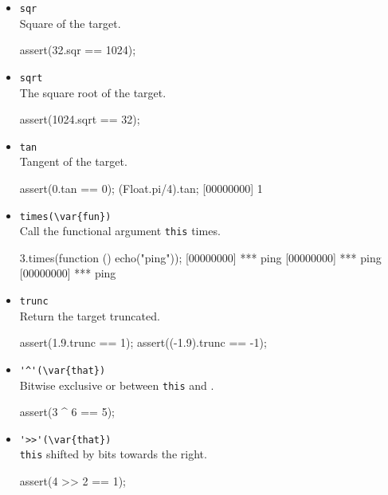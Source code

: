 \begin{itemize}
\item \lstinline|sqr|\\
  Square of the target.
\begin{urbiscript}[firstnumber=last]
assert(32.sqr == 1024);
\end{urbiscript}

\item \lstinline|sqrt|\\
  The square root of the target.
\begin{urbiscript}[firstnumber=last]
assert(1024.sqrt == 32);
\end{urbiscript}

\item \lstinline|tan|\\
  Tangent of the target.
\begin{urbiscript}[firstnumber=last]
assert(0.tan == 0);
(Float.pi/4).tan;
[00000000] 1
\end{urbiscript}

\item \lstinline|times(\var{fun})|\\
  Call the functional argument  \lstinline|this| times.

\begin{urbiscript}[firstnumber=last]
3.times(function () { echo("ping")});
[00000000] *** ping
[00000000] *** ping
[00000000] *** ping
\end{urbiscript}

\item \lstinline|trunc|\\
  Return the target truncated.
\begin{urbiscript}[firstnumber=last]
assert(1.9.trunc == 1);
assert((-1.9).trunc == -1);
\end{urbiscript}

\item \lstinline|'^'(\var{that})|\\
  Bitwise exclusive or between \lstinline|this| and .
\begin{urbiscript}[firstnumber=last]
assert(3 ^ 6 == 5);
\end{urbiscript}

\item \lstinline|'>>'(\var{that})|\\%
  \lstinline|this| shifted by  bits towards the right.
\begin{urbiscript}[firstnumber=last]
assert(4 >> 2 == 1);
\end{urbiscript}


\end{itemize}
